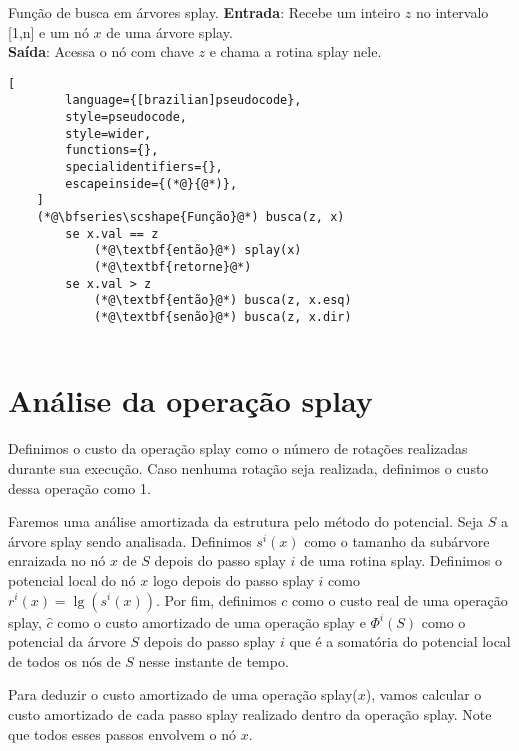 \begin{programruledcaption}{Função de busca em árvores splay.\label{prog:busca}}
    \noindent\textbf{Entrada}: Recebe um inteiro $z$ no intervalo [1,n] e um nó $x$ de uma árvore splay.\\
    \textbf{Saída}: Acessa o nó com chave $z$ e chama a rotina splay nele.
    \vspace{-0.5\baselineskip}
    \begin{lstlisting}[
        language={[brazilian]pseudocode},
        style=pseudocode,
        style=wider,
        functions={},
        specialidentifiers={},
        escapeinside={(*@}{@*)},
    ]
    (*@\bfseries\scshape{Função}@*) busca(z, x)
        se x.val == z
            (*@\textbf{então}@*) splay(x)
            (*@\textbf{retorne}@*)
        se x.val > z
            (*@\textbf{então}@*) busca(z, x.esq)
            (*@\textbf{senão}@*) busca(z, x.dir)
        
    \end{lstlisting}
    \vspace{-0.5\baselineskip}
\end{programruledcaption}

\section{Análise da operação splay}

Definimos o custo da operação splay como o número de rotações realizadas durante sua execução. Caso nenhuma rotação seja realizada, definimos o custo dessa operação como 1. 

Faremos uma análise amortizada da estrutura pelo método do potencial. Seja $S$ a árvore splay sendo analisada. Definimos $s^{i}(x)$ como o tamanho da subárvore enraizada no nó $x$ de $S$ depois do passo splay $i$ de uma rotina splay. Definimos o potencial local do nó $x$ logo depois do passo splay $i$ como $r^{i}(x) = \lg(s^{i}(x))$. Por fim, definimos $c$ como o custo real de uma operação splay, \( \hat{c}\) como o custo amortizado de uma operação splay e $\Phi^{i}(S)$ como o potencial da árvore $S$ depois do passo splay $i$ que é a somatória do potencial local de todos os nós de $S$ nesse instante de tempo.

Para deduzir o custo amortizado de uma operação splay($x$), vamos calcular o custo amortizado de cada passo splay realizado dentro da operação splay. Note que todos esses passos envolvem o nó $x$.

